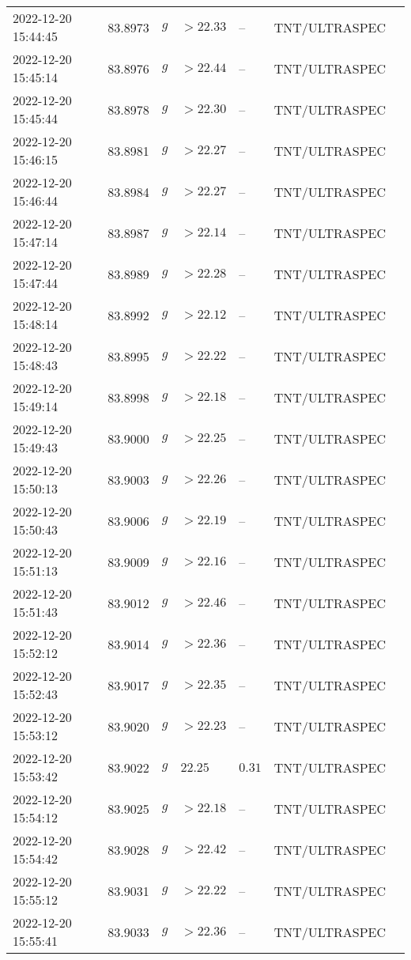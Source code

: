 \documentclass{nature_plusfigure}
\begin{document}
\begin{supplement}
\begin{center}
\begin{longtable}{lllllll}
2022-12-20 15:44:45 & 83.8973 & $g$ & $>22.33$ & -- & TNT/ULTRASPEC &  \\ 
2022-12-20 15:45:14 & 83.8976 & $g$ & $>22.44$ & -- & TNT/ULTRASPEC &  \\ 
2022-12-20 15:45:44 & 83.8978 & $g$ & $>22.30$ & -- & TNT/ULTRASPEC &  \\ 
2022-12-20 15:46:15 & 83.8981 & $g$ & $>22.27$ & -- & TNT/ULTRASPEC &  \\ 
2022-12-20 15:46:44 & 83.8984 & $g$ & $>22.27$ & -- & TNT/ULTRASPEC &  \\ 
2022-12-20 15:47:14 & 83.8987 & $g$ & $>22.14$ & -- & TNT/ULTRASPEC &  \\ 
2022-12-20 15:47:44 & 83.8989 & $g$ & $>22.28$ & -- & TNT/ULTRASPEC &  \\ 
2022-12-20 15:48:14 & 83.8992 & $g$ & $>22.12$ & -- & TNT/ULTRASPEC &  \\ 
2022-12-20 15:48:43 & 83.8995 & $g$ & $>22.22$ & -- & TNT/ULTRASPEC &  \\ 
2022-12-20 15:49:14 & 83.8998 & $g$ & $>22.18$ & -- & TNT/ULTRASPEC &  \\ 
2022-12-20 15:49:43 & 83.9000 & $g$ & $>22.25$ & -- & TNT/ULTRASPEC &  \\ 
2022-12-20 15:50:13 & 83.9003 & $g$ & $>22.26$ & -- & TNT/ULTRASPEC &  \\ 
2022-12-20 15:50:43 & 83.9006 & $g$ & $>22.19$ & -- & TNT/ULTRASPEC &  \\ 
2022-12-20 15:51:13 & 83.9009 & $g$ & $>22.16$ & -- & TNT/ULTRASPEC &  \\ 
2022-12-20 15:51:43 & 83.9012 & $g$ & $>22.46$ & -- & TNT/ULTRASPEC &  \\ 
2022-12-20 15:52:12 & 83.9014 & $g$ & $>22.36$ & -- & TNT/ULTRASPEC &  \\ 
2022-12-20 15:52:43 & 83.9017 & $g$ & $>22.35$ & -- & TNT/ULTRASPEC &  \\ 
2022-12-20 15:53:12 & 83.9020 & $g$ & $>22.23$ & -- & TNT/ULTRASPEC &  \\ 
2022-12-20 15:53:42 & 83.9022 & $g$ & $22.25$ & $0.31$ & TNT/ULTRASPEC &  \\ 
2022-12-20 15:54:12 & 83.9025 & $g$ & $>22.18$ & -- & TNT/ULTRASPEC &  \\ 
2022-12-20 15:54:42 & 83.9028 & $g$ & $>22.42$ & -- & TNT/ULTRASPEC &  \\ 
2022-12-20 15:55:12 & 83.9031 & $g$ & $>22.22$ & -- & TNT/ULTRASPEC &  \\ 
2022-12-20 15:55:41 & 83.9033 & $g$ & $>22.36$ & -- & TNT/ULTRASPEC &  \\ 

\end{longtable}
\end{center}
\end{supplement}
\end{document}
